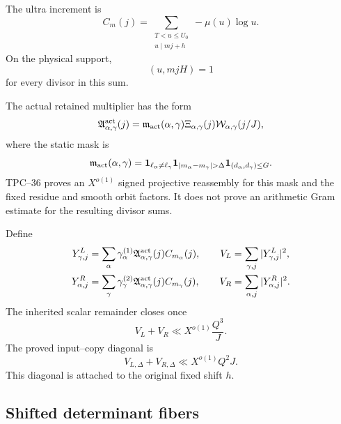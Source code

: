The ultra increment is
\begin{equation}
 C_m(j)=\sum_{\substack{T<u\le U_0\\u\mid mj+h}}
 -\mu(u)\log u.
 \label{eq:tpc38-interface-ultra}
\end{equation}
On the physical support,
\begin{equation}
 (u,mjH)=1
 \label{eq:tpc38-interface-primitivity}
\end{equation}
for every divisor in this sum.

The actual retained multiplier has the form
\begin{equation}
 \mathfrak A_{\alpha,\gamma}^{\rm act}(j)
 =\mathfrak m_{\rm act}(\alpha,\gamma)
  \Xi_{\alpha,\gamma}(j)
  \mathcal W_{\alpha,\gamma}(j/J),
 \label{eq:tpc38-interface-multiplier}
\end{equation}
where the static mask is
\begin{equation}
 \mathfrak m_{\rm act}(\alpha,\gamma)
 =\one_{\ell_\alpha\ne\ell_\gamma}
  \one_{|m_\alpha-m_\gamma|>\Delta}
  \one_{(d_\alpha,d_\gamma)\le G}.
 \label{eq:tpc38-interface-static-mask}
\end{equation}
TPC--36 proves an \(X^{o(1)}\) signed projective reassembly for this mask
and the fixed residue and smooth orbit factors.  It does not prove an
arithmetic Gram estimate for the resulting divisor sums.

Define
\begin{align}
 Y_{\gamma,j}^L
 &=\sum_\alpha\gamma_\alpha^{(1)}
 \mathfrak A_{\alpha,\gamma}^{\rm act}(j)C_{m_\alpha}(j),
 \qquad
 V_L=\sum_{\gamma,j}|Y_{\gamma,j}^L|^2,
 \label{eq:tpc38-interface-left}\\
 Y_{\alpha,j}^R
 &=\sum_\gamma\gamma_\gamma^{(2)}
 \mathfrak A_{\alpha,\gamma}^{\rm act}(j)C_{m_\gamma}(j),
 \qquad
 V_R=\sum_{\alpha,j}|Y_{\alpha,j}^R|^2.
 \label{eq:tpc38-interface-right}
\end{align}
The inherited scalar remainder closes once
\begin{equation}
 \boxed{V_L+V_R\ll X^{o(1)}\frac{Q^3}{J}.}
 \label{eq:tpc38-interface-gate}
\end{equation}
The proved input--copy diagonal is
\begin{equation}
 V_{L,\Delta}+V_{R,\Delta}
 \ll X^{o(1)}Q^2J.
 \label{eq:tpc38-interface-diagonal}
\end{equation}
This diagonal is attached to the original fixed shift \(h\).

\subsection{Shifted determinant fibers}

